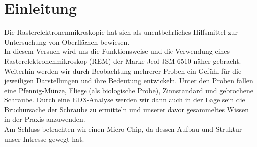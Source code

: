 
\chapter{Einleitung}
\label{chap:einleitung}

Die Rasterelektronenmikroskopie hat sich als unentbehrliches Hilfsmittel zur Untersuchung von Oberflächen bewiesen.\\

In diesem Versuch wird uns die Funktionsweise und die Verwendung eines Rasterelektronenmikroskop (REM) der Marke Jeol JSM 6510 näher gebracht. Weiterhin werden wir durch Beobachtung mehrerer Proben ein Gefühl für die jeweiligen Darstellungen und ihre Bedeutung entwickeln. Unter den Proben fallen eine Pfennig-Münze, Fliege (als biologische Probe), Zinnstandard und gebrochene Schraube. Durch eine EDX-Analyse werden wir dann auch in der Lage sein die Bruchursache der Schraube zu ermitteln und unserer davor gesammeltes Wissen in der Praxis anzuwenden.\\

Am Schluss betrachten wir einen Micro-Chip, da dessen Aufbau und Struktur unser Intresse gewegt hat. 